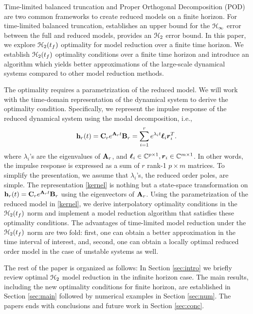 \documentclass[twocolumn]{autart}
\begin{document}
Time-limited balanced truncation \cite{GawJ90,GugA03,RedK17,Kur17} and Proper Orthogonal Decomposition (POD)   \cite{HolLB96}  are two common frameworks to create reduced models on a finite horizon. 
For time-limited balanced truncation, \cite{GugA03} establishes an upper bound for the $\EuScript{H}_\infty$ error between the full and reduced models,  \cite{RedK17} provides an $\EuScript{H}_2$ error bound. In this paper,  we explore $\EuScript{H}_2(t_f)$ optimality for model reduction over a finite time horizon. 
  We establish $\EuScript{H}_2(t_f)$ optimality conditions over a finite time horizon and introduce an algorithm which yields better approximations of the large-scale dynamical systems compared to other model reduction methods.
 
The optimality requires a parametrization of the reduced model. We will work with the time-domain representation of the dynamical system to derive the optimality condition. Specifically, we represent the impulse response of the reduced dynamical system using the modal decomposition, i.e.,
 \begin{equation}\label{kernel}
\begin{aligned}
\mathbf{h}_r(t)=\mathbf{C}_r e^{\mathbf{A}_r t}\mathbf{B}_r=\sum_{i=1}^r e^{\lambda_it}\boldsymbol{\ell}_i\boldsymbol{r}_i^T.
\end{aligned}
\end{equation}
where $\lambda_i$'s are the eigenvalues of $\mathbf{A}_r$, and $\boldsymbol{\ell}_i \in \mathbb{C}^{p\times 1}, \boldsymbol{r}_i\in \mathbb{C}^{m\times1}$. 
In other words, the impulse response is expressed as a sum of $r$ rank-1 $p\times m$  matrices.
To simplify the presentation,  we assume  that $\lambda_i$'s, the reduced order poles,  are simple.  The representation \eqref{kernel} 
is nothing but a state-space transformation on $\mathbf{h}_r(t)=\mathbf{C}_r e^{\mathbf{A}_r t}\mathbf{B}_r$ using the eigenvectors of $\mathbf{A}_r$. 
Using the parametrization of the reduced model in \eqref{kernel}, we derive interpolatory optimality conditions in the $\EuScript{H}_2(t_f)$ norm and implement a model reduction algorithm that satisfies these optimality conditions.
 The advantages of time-limited model reduction under the $\EuScript{H}_2(t_f)$ norm are two fold: first, one can obtain a better approximation in the time interval of interest, and, second, one can obtain a locally optimal reduced order model in the case of unstable systems as well. 

The rest of the paper is organized as follows: In Section  \ref{sec:intro} we briefly review optimal  $\EuScript{H}_2$ model reduction in the infinite horizon case. The main results, including the new optimality conditions for finite horizon, are established in Section \ref{sec:main} followed by numerical examples in Section \ref{sec:num}. The papers ends with conclusions and future work in Section \ref{sec:conc}.
\end{document}
